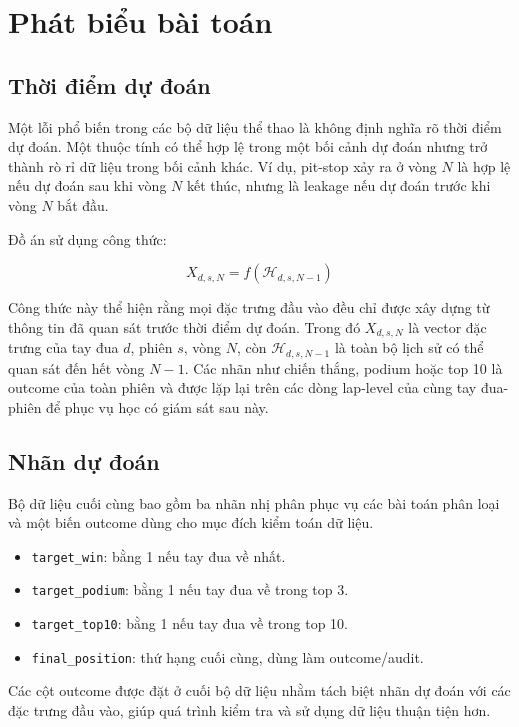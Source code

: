\documentclass[conference]{IEEEtran}
\begin{document}
\section{Phát biểu bài toán}
\subsection{Thời điểm dự đoán}
Một lỗi phổ biến trong các bộ dữ liệu thể thao là không định nghĩa rõ thời điểm dự đoán. Một thuộc tính có thể hợp lệ trong một bối cảnh dự đoán nhưng trở thành rò rỉ dữ liệu trong bối cảnh khác. Ví dụ, pit-stop xảy ra ở vòng \(N\) là hợp lệ nếu dự đoán sau khi vòng \(N\) kết thúc, nhưng là leakage nếu dự đoán trước khi vòng \(N\) bắt đầu.

Đồ án sử dụng công thức:

\begin{equation}
X_{d,s,N} = f(\mathcal{H}_{d,s,N-1})
\end{equation}

Công thức này thể hiện rằng mọi đặc trưng đầu vào đều chỉ được xây dựng từ thông tin đã quan sát trước thời điểm dự đoán. Trong đó \(X_{d,s,N}\) là vector đặc trưng của tay đua \(d\), phiên \(s\), vòng \(N\), còn \(\mathcal{H}_{d,s,N-1}\) là toàn bộ lịch sử có thể quan sát đến hết vòng \(N-1\). Các nhãn như chiến thắng, podium hoặc top 10 là outcome của toàn phiên và được lặp lại trên các dòng lap-level của cùng tay đua-phiên để phục vụ học có giám sát sau này.

\subsection{Nhãn dự đoán}
Bộ dữ liệu cuối cùng bao gồm ba nhãn nhị phân phục vụ các bài toán phân loại và một biến outcome dùng cho mục đích kiểm toán dữ liệu.

\begin{itemize}
    \item \texttt{target\_win}: bằng 1 nếu tay đua về nhất.
    \item \texttt{target\_podium}: bằng 1 nếu tay đua về trong top 3.
    \item \texttt{target\_top10}: bằng 1 nếu tay đua về trong top 10.
    \item \texttt{final\_position}: thứ hạng cuối cùng, dùng làm outcome/audit.
\end{itemize}

Các cột outcome được đặt ở cuối bộ dữ liệu nhằm tách biệt nhãn dự đoán với các đặc trưng đầu vào, giúp quá trình kiểm tra và sử dụng dữ liệu thuận tiện hơn.
\end{document}
